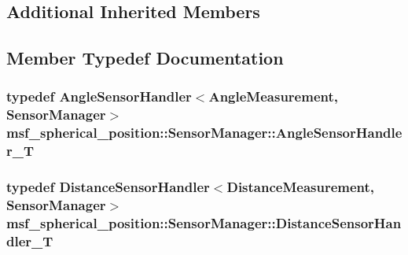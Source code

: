 \subsection*{Additional Inherited Members}


\subsection{Member Typedef Documentation}
\hypertarget{classmsf__spherical__position_1_1SensorManager_ae4c6b1d54308f35a6b14174068a79922}{
\subsubsection[{Angle\-Sensor\-Handler\-\_\-\-T}]{\setlength{\rightskip}{0pt plus 5cm}typedef Angle\-Sensor\-Handler$<$Angle\-Measurement, {\bf Sensor\-Manager}$>$ {\bf msf\-\_\-spherical\-\_\-position\-::\-Sensor\-Manager\-::\-Angle\-Sensor\-Handler\-\_\-\-T}\hspace{0.3cm}{\ttfamily [private]}}}\label{classmsf__spherical__position_1_1SensorManager_ae4c6b1d54308f35a6b14174068a79922}
\hypertarget{classmsf__spherical__position_1_1SensorManager_aa3757032c5c9ee975d70be8502956e23}{
\subsubsection[{Distance\-Sensor\-Handler\-\_\-\-T}]{\setlength{\rightskip}{0pt plus 5cm}typedef Distance\-Sensor\-Handler$<$Distance\-Measurement, {\bf Sensor\-Manager}$>$ {\bf msf\-\_\-spherical\-\_\-position\-::\-Sensor\-Manager\-::\-Distance\-Sensor\-Handler\-\_\-\-T}\hspace{0.3cm}{\ttfamily [private]}}}\label{classmsf__spherical__position_1_1SensorManager_aa3757032c5c9ee975d70be8502956e23}

